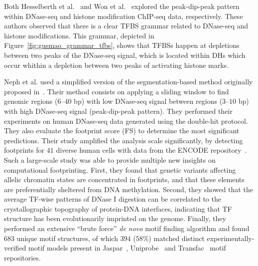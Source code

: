 Both Hesselberth et al.~\cite{hesselberth2009} and Won et al.~\cite{won2010} explored the peak-dip-peak pattern within DNase-seq and histone modification ChIP-seq data, respectively. These authors observed that there is a clear TFBS grammar related to DNase-seq and histone modifications. This grammar, depicted in Figure~\ref{fig:gusmao_grammar_tfbs}, shows that TFBSs happen at depletions between two peaks of the DNase-seq signal, which is located within DHs which occur whithin a depletion between two peaks of activating histone marks.

Neph et al.\cite{neph2012a} used a simplified version of the segmentation-based method originally proposed in~\cite{hesselberth2009}. Their method consists on applying a sliding window to find genomic regions ($6$--$40$ bp) with low DNase-seq signal between regions ($3$--$10$ bp) with high DNase-seq signal (peak-dip-peak pattern). They performed their experiments on human DNase-seq data generated using the double-hit protocol. They also evaluate the footprint score (FS) to determine the most significant predictions. Their study amplified the analysis scale significantly, by detecting footprints for $41$ diverse human cells with data from the ENCODE repository~\cite{encode2012}. Such a large-scale study was able to provide multiple new insights on computational footprinting. First, they found that genetic variants affecting allelic chromatin states are concentrated in footprints, and that these elements are preferentially sheltered from DNA methylation. Second, they showed that the average TF-wise patterns of DNase I digestion can be correlated to the crystallographic topography of protein-DNA interfaces, indicating that TF structure has been evolutionarily imprinted on the genome. Finally, they performed an extensive ``brute force'' \emph{de novo} motif finding algorithm and found $683$ unique motif structures, of which $394$ ($58\%$) matched distinct experimentally-verified motif models present in Jaspar~\cite{mathelier2014}, Uniprobe~\cite{robasky2011} and Transfac~\cite{matys2006} motif repositories.

